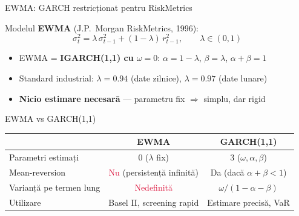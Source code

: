 \documentclass[9pt, aspectratio=169, t]{beamer}
\begin{document}
\begin{frame}{EWMA: GARCH restricționat pentru RiskMetrics}
    \small
        \vspace{-0.2cm}
        \begin{defn}
            Modelul \textbf{EWMA} (J.P.\ Morgan RiskMetrics, 1996):
            \vspace{-2mm}
            \[
                \sigma_t^2 = \lambda\, \sigma_{t-1}^2 + (1 - \lambda)\, r_{t-1}^2, \qquad \lambda \in (0,1)
            \]
        \end{defn}
        \vspace{-0.2cm}
        \begin{prop}
            \begin{itemize}
                \item EWMA = \textbf{IGARCH(1,1) cu $\omega = 0$}: \quad $\alpha = 1 - \lambda$, \; $\beta = \lambda$, \; $\alpha + \beta = 1$
                \item Standard industrial: $\lambda = 0.94$ (date zilnice), $\lambda = 0.97$ (date lunare)
                \item \textbf{Nicio estimare necesară} --- parametru fix $\Rightarrow$ simplu, dar rigid
            \end{itemize}
        \end{prop}
        \vspace{-0.2cm}
        \begin{alertblock}{EWMA vs GARCH(1,1)}
            \vspace{-1mm}
            \begin{center}
            \begin{tabular}{lcc}
                \toprule
                & \textbf{EWMA} & \textbf{GARCH(1,1)} \\
                \midrule
                Parametri estimați & 0 ($\lambda$ fix) & 3 ($\omega, \alpha, \beta$) \\
                Mean-reversion & \textcolor{Crimson}{Nu} (persistență infinită) & \textcolor{Forest}{Da} (dacă $\alpha + \beta < 1$) \\
                Varianță pe termen lung & \textcolor{Crimson}{Nedefinită} & \textcolor{Forest}{$\omega / (1 - \alpha - \beta)$} \\
                Utilizare & Basel II, screening rapid & Estimare precisă, VaR \\
                \bottomrule
            \end{tabular}
            \end{center}
        \end{alertblock}
\end{frame}
\end{document}

